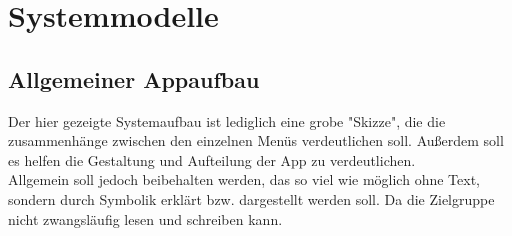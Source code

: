 \documentclass{scrartcl}
\begin{document}
\clearpage

\section{Systemmodelle}

\subsection{Allgemeiner Appaufbau}

Der hier gezeigte Systemaufbau ist lediglich eine grobe "Skizze",
die die zusammenhänge zwischen den einzelnen Menüs verdeutlichen soll.
Außerdem soll es helfen die Gestaltung und Aufteilung der App zu verdeutlichen.\\
Allgemein soll jedoch beibehalten werden, das so viel wie möglich ohne Text, sondern durch Symbolik erklärt bzw. dargestellt werden soll. Da die Zielgruppe nicht zwangsläufig lesen und schreiben kann.
\end{document}
